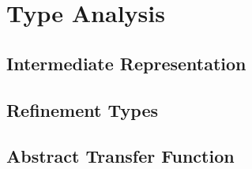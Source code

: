 \section{Type Analysis}\label{sec:analysis}

\subsection{Intermediate Representation}

\subsection{Refinement Types}

\subsection{Abstract Transfer Function}
